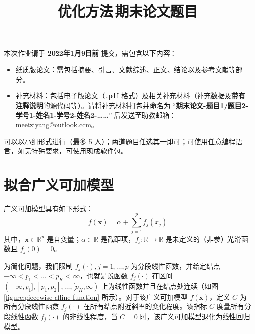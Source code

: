 \documentclass[cn,12pt,mtpro2]{elegantpaper}
\title{优化方法\,期末论文题目}
\author{}
\date{\zhtoday}
\begin{document}
\maketitle

\noindent 本次作业请于 \textbf{2022年1月9日前} 提交，需包含以下内容：
\begin{itemize}
    \item 纸质版论文：需包括摘要、引言、文献综述、正文、结论以及参考文献等部分。
    \item 补充材料：包括电子版论文（\texttt{.pdf} 格式）及相关补充材料（补充数据及\textbf{带有注释说明}的源代码等）。请将补充材料打包并命名为 “\textbf{期末论文-题目1/题目2-学号1-姓名1-学号2-姓名2-……}” 后发送至助教邮箱：\href{mailto:meetziyang@outlook.com}{meetziyang@outlook.com}。
\end{itemize}

\noindent 可以以小组形式进行（最多 5 人）；两道题目任选其一即可；可使用任意编程语言，如无特殊要求，可使用现成软件包。


\section{拟合广义可加模型}

广义可加模型具有如下形式：
\begin{equation}
    f(\mathbf{x})=\alpha+\sum_{j=1}^{p}f_{j}(x_{j})
\end{equation}
其中，$\mathbf{x}\in\mathbb{R}^{p}$ 是自变量；$\alpha\in\mathbb{R}$ 是截距项，$f_{j}:\mathbb{R}\rightarrow\mathbb{R}$ 是未定义的（非参）光滑函数且 $f_{j}(0)=0$。

为简化问题，我们限制 $f_{j}(\cdot),j=1,\ldots,p$ 为分段线性函数，并给定结点 $-\infty<p_{1}<\ldots<p_{K}<\infty$，也就是说函数 $f_{j}(\cdot)$ 在区间 $(-\infty,p_{1}],[p_{1},p_{2}],\ldots,[p_{K},\infty)$ 上为线性函数并且在结点处连续（如图 \ref{figure:piecewise-affine-function} 所示）。对于该广义可加模型 $f(\mathbf{x})$，定义 $C$ 为所有分段线性函数 $f_{j}(\cdot)$ 在所有结点附近斜率的变化程度。该指标 $C$ 度量所有分段线性函数 $f_{j}(\cdot)$ 的非线性程度，当 $C=0$ 时，该广义可加模型退化为线性回归模型。
\end{document}
